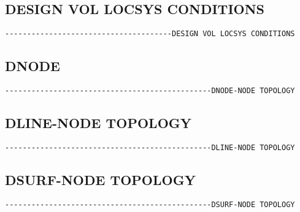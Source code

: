 
\subsection{DESIGN VOL LOCSYS CONDITIONS}
\begin{verbatim}
--------------------------------------DESIGN VOL LOCSYS CONDITIONS
\end{verbatim}


\subsection{DNODE}
\begin{verbatim}
-----------------------------------------------DNODE-NODE TOPOLOGY
\end{verbatim}



\subsection{DLINE-NODE TOPOLOGY}
\begin{verbatim}
-----------------------------------------------DLINE-NODE TOPOLOGY
\end{verbatim}



\subsection{DSURF-NODE TOPOLOGY}
\begin{verbatim}
-----------------------------------------------DSURF-NODE TOPOLOGY
\end{verbatim}



